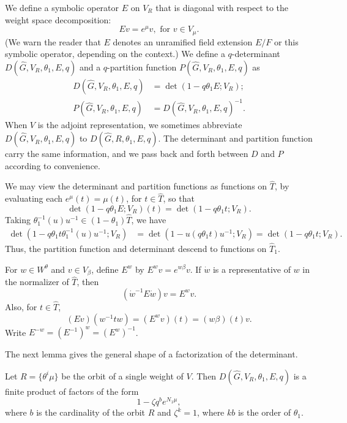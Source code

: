 We define a symbolic operator $E$ on $V_R$ that is diagonal with
respect to the weight space decomposition:
\[
E v = e^{\mu} v, \text{ for } v \in V_\mu.
\]
(We warn the reader that $E$ denotes an unramified field extension $E/F$
or this symbolic operator, depending on the context.)
We define a $q$-determinant $D(\hat G,V_R,\theta_1,E,q)$ and a
$q$-partition function $P(\hat G,V_R,\theta_1,E,q)$ as
\begin{align}\label{eqn:det}
D(\hat G,V_R,\theta_1,E,q) &= \det(1- q \theta_1 E;V_R);\\ 
P(\hat G,V_R,\theta_1,E,q) &= D(\hat G,V_R,\theta_1,E,q)^{-1}.
\end{align}
When $V$ is the adjoint representation, we sometimes abbreviate
$D(\hat G,V_R,\theta_1,E,q)$ to $D(\hat G,R,\theta_1,E,q)$.
The determinant and partition function carry the same information,
and we pass back and forth between $D$ and $P$ according to convenience.


We may view the determinant and partition functions as functions on
$\hat T$, by evaluating each $e^\mu (t) = \mu(t)$, for $t\in \hat T$,
so that
\[
\det(1- q\theta_1 E;V_R)(t) = \det(1-q\theta_1 t;V_R).
\]
Taking $\theta_1^{-1}(u) u^{-1}\in (1-\theta_1)\hat T$, we have
\begin{align*}
\det (1-q \theta_1 t \theta_1^{-1}(u) u^{-1};V_R) 
&= \det(1- u (q \theta_1 t ) u^{-1};V_R) = \det(1-q\theta_1 t;V_R).
\end{align*}
Thus, the partition function and determinant descend to functions on
$\hat T_1$.  

For $w\in W^\theta$ and $v\in V_\beta$, 
define $E^w$ by $E^w v = e^{w\beta} v$.
If $\dot w$ is a representative of $w$ in the normalizer of $\hat T$, then
\[
(\dot w^{-1} E \dot w) v = E^w v.
\]
Also, for $t\in \hat T$,
\[
(E v) (w^{-1} t w) = (E^w v) (t) = (w\beta)(t) v.
\]
Write $E^{-w} = (E^{-1})^w = (E^w)^{-1}$.


The next lemma gives the general shape of a factorization
of the determinant.

\begin{lemma}\label{lemma:fact}  
  Let $R = \{\theta^i\mu\}$ be the orbit of a single weight of $V$.
  Then $D(\hat G,V_R,\theta_1,E,q)$ is a finite product of factors of
  the form
\[
1 - \zeta q^b e^{N_1\mu},
\]
where $b$ is the cardinality of the orbit $R$ and $\zeta^k=1$, where
$k b$ is the order of $\theta_1$.
\end{lemma}

